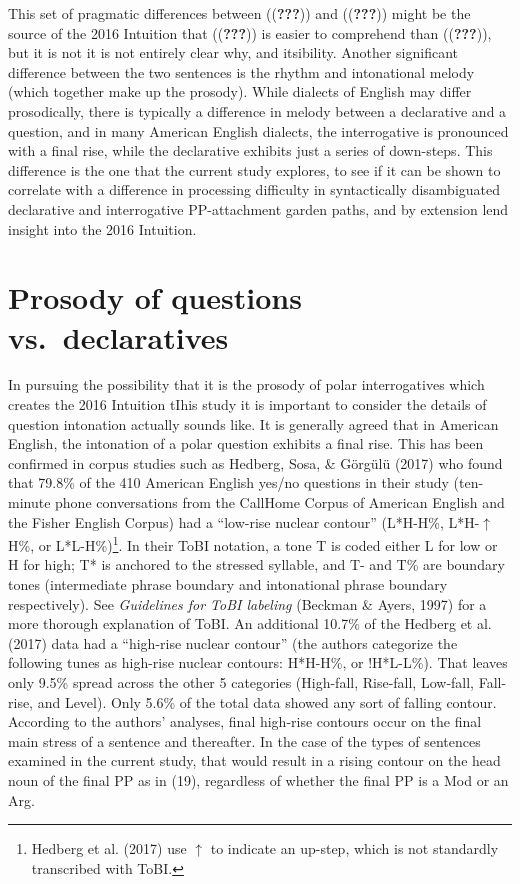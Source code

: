 \documentclass[12pt,oneside]{book}
\let\rmarkdownfootnote\footnote%
\def\footnote{\protect\rmarkdownfootnote}
\begin{document}
This set of pragmatic differences between (({\textbf{???}})) and (({\textbf{???}})) might be the source of the 2016 Intuition that (({\textbf{???}})) is easier to comprehend than (({\textbf{???}})), but it is not it is not entirely clear why, and itsibility. Another significant difference between the two sentences is the rhythm and intonational melody (which together make up the prosody). While dialects of English may differ prosodically, there is typically a difference in melody between a declarative and a question, and in many American English dialects, the interrogative is pronounced with a final rise, while the declarative exhibits just a series of down-steps. This difference is the one that the current study explores, to see if it can be shown to correlate with a difference in processing difficulty in syntactically disambiguated declarative and interrogative PP-attachment garden paths, and by extension lend insight into the 2016 Intuition.

\hypertarget{prosody-of-questions-vs.-declaratives}{%
\section{Prosody of questions vs.~declaratives}\label{prosody-of-questions-vs.-declaratives}}

In pursuing the possibility that it is the prosody of polar interrogatives which creates the 2016 Intuition tIhis study it is important to consider the details of question intonation actually sounds like. It is generally agreed that in American English, the intonation of a polar question exhibits a final rise. This has been confirmed in corpus studies such as Hedberg, Sosa, \& Görgülü (2017) who found that 79.8\% of the 410 American English yes/no questions in their study (ten-minute phone conversations from the CallHome Corpus of American English and the Fisher English Corpus) had a ``low-rise nuclear contour'' (L*H-H\%, L*H-\(\uparrow\)H\%, or L*L-H\%)\footnote{Hedberg et al. (2017) use \(\uparrow\) to indicate an up-step, which is not standardly transcribed with ToBI.}. In their ToBI notation, a tone T is coded either L for low or H for high; T* is anchored to the stressed syllable, and T- and T\% are boundary tones (intermediate phrase boundary and intonational phrase boundary respectively). See \emph{Guidelines for ToBI labeling} (Beckman \& Ayers, 1997) for a more thorough explanation of ToBI. An additional 10.7\% of the Hedberg et al. (2017) data had a ``high-rise nuclear contour'' (the authors categorize the following tunes as high-rise nuclear contours: H*H-H\%, or !H*L-L\%). That leaves only 9.5\% spread across the other 5 categories (High-fall, Rise-fall, Low-fall, Fall-rise, and Level). Only 5.6\% of the total data showed any sort of falling contour. According to the authors' analyses, final high-rise contours occur on the final main stress of a sentence and thereafter. In the case of the types of sentences examined in the current study, that would result in a rising contour on the head noun of the final PP as in (19), regardless of whether the final PP is a Mod or an Arg.
\end{document}

